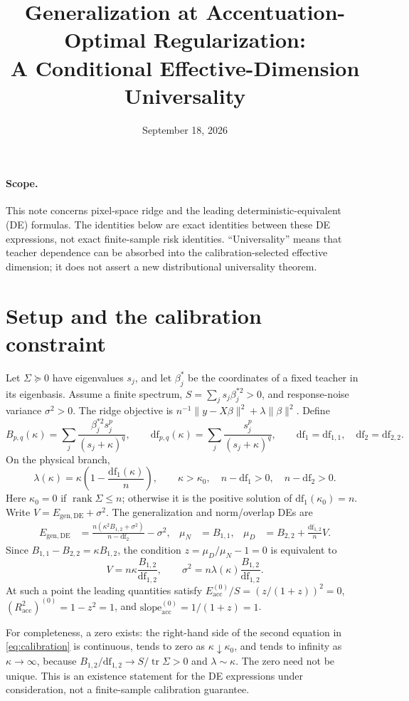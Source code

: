 \documentclass[11pt]{article}
\title{Generalization at Accentuation-Optimal Regularization:\\A Conditional Effective-Dimension Universality}
\author{}
\date{September 18, 2026}
\newcommand{\df}{\mathrm{df}}
\newcommand{\tr}{\operatorname{tr}}
\newcommand{\Eg}{E_{\mathrm{gen,DE}}}
\begin{document}
\maketitle

\paragraph{Scope.}
This note concerns pixel-space ridge and the leading deterministic-equivalent
(DE) formulas. The identities below are exact identities between these DE
expressions, not exact finite-sample risk identities. ``Universality'' means
that teacher dependence can be absorbed into the calibration-selected effective
dimension; it does not assert a new distributional universality theorem.

\section{Setup and the calibration constraint}
Let $\Sigma\succeq0$ have eigenvalues $s_j$, and let $\beta_j^*$ be the
coordinates of a fixed teacher in its eigenbasis. Assume a finite spectrum,
$S=\sum_j s_j\beta_j^{*2}>0$, and response-noise variance $\sigma^2>0$.
The ridge objective is $n^{-1}\|y-X\beta\|^2+\lambda\|\beta\|^2$.
Define
\[
 B_{p,q}(\kappa)=\sum_j\frac{\beta_j^{*2}s_j^p}{(s_j+\kappa)^q},\qquad
 \df_{p,q}(\kappa)=\sum_j\frac{s_j^p}{(s_j+\kappa)^q},\qquad
 \df_1=\df_{1,1},\quad \df_2=\df_{2,2}.
\]
On the physical branch,
\[
 \lambda(\kappa)=\kappa\left(1-\frac{\df_1(\kappa)}n\right),\qquad
 \kappa>\kappa_0,\quad n-\df_1>0,\quad n-\df_2>0.
\]
Here $\kappa_0=0$ if $\operatorname{rank}\Sigma\le n$; otherwise it is the
positive solution of $\df_1(\kappa_0)=n$.
Write $V=\Eg+\sigma^2$. The generalization and norm/overlap DEs are
\begin{align}
 \Eg&=\frac{n(\kappa^2B_{1,2}+\sigma^2)}{n-\df_2}-\sigma^2,
 &\mu_N&=B_{1,1},
 &\mu_D&=B_{2,2}+\frac{\df_{1,2}}nV.
\end{align}
Since $B_{1,1}-B_{2,2}=\kappa B_{1,2}$, the condition
$z=\mu_D/\mu_N-1=0$ is equivalent to
\begin{equation}\label{eq:calibration}
 V=n\kappa\frac{B_{1,2}}{\df_{1,2}},\qquad
 \sigma^2=n\lambda(\kappa)\frac{B_{1,2}}{\df_{1,2}}.
\end{equation}
At such a point the leading quantities satisfy
$E_{\mathrm{acc}}^{(0)}/S=(z/(1+z))^2=0$,
$(R_{\mathrm{acc}}^2)^{(0)}=1-z^2=1$, and
$\mathrm{slope}_{\mathrm{acc}}^{(0)}=1/(1+z)=1$.

For completeness, a zero exists: the right-hand side of the second equation
in \eqref{eq:calibration} is continuous, tends to zero as
$\kappa\downarrow\kappa_0$, and tends to infinity as $\kappa\to\infty$,
because $B_{1,2}/\df_{1,2}\to S/\tr\Sigma>0$ and $\lambda\sim\kappa$.
The zero need not be unique. This is an existence statement for the DE
expressions under consideration, not a finite-sample calibration guarantee.
\end{document}
